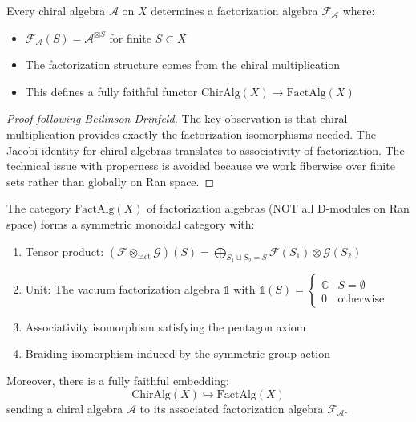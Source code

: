 \begin{theorem}\label{thm:chiral-as-fact}
Every chiral algebra $\mathcal{A}$ on $X$ determines a factorization algebra $\mathcal{F}_\mathcal{A}$ where:
\begin{itemize}
\item $\mathcal{F}_\mathcal{A}(S) = \mathcal{A}^{\boxtimes S}$ for finite $S \subset X$
\item The factorization structure comes from the chiral multiplication
\item This defines a fully faithful functor $\text{ChirAlg}(X) \to \text{FactAlg}(X)$
\end{itemize}
\end{theorem}

\begin{proof}[Proof following Beilinson-Drinfeld]
The key observation is that chiral multiplication provides exactly the factorization isomorphisms needed.
The Jacobi identity for chiral algebras translates to associativity of factorization. The technical 
issue with properness is avoided because we work fiberwise over finite sets rather than globally on Ran space.
\end{proof}


\begin{theorem}\label{thm:fact-monoidal-corrected}
The category $\text{FactAlg}(X)$ of factorization algebras (NOT all D-modules on Ran space) forms a symmetric monoidal 
category with:
\begin{enumerate}
\item Tensor product: $(\mathcal{F} \otimes_{\text{fact}} \mathcal{G})(S) = \bigoplus_{S_1 \sqcup S_2 = S} \mathcal{F}(S_1) \otimes \mathcal{G}(S_2)$
\item Unit: The vacuum factorization algebra $\mathbb{1}$ with $\mathbb{1}(S) = \begin{cases} \mathbb{C} & S = \emptyset \\ 0 & \text{otherwise} \end{cases}$
\item Associativity isomorphism satisfying the pentagon axiom
\item Braiding isomorphism induced by the symmetric group action
\end{enumerate}

Moreover, there is a fully faithful embedding:
$$\text{ChirAlg}(X) \hookrightarrow \text{FactAlg}(X)$$
sending a chiral algebra $\mathcal{A}$ to its associated factorization algebra $\mathcal{F}_{\mathcal{A}}$.
\end{theorem}

